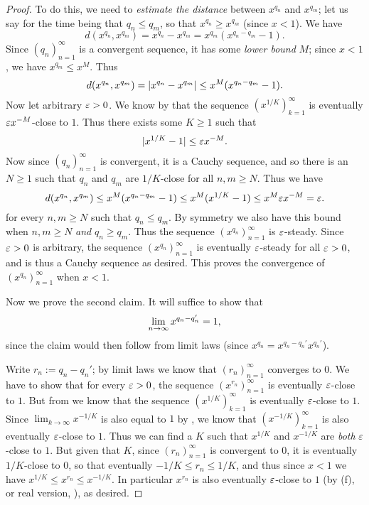 \begin{proof}
To do this, we need to \emph{estimate the distance} between \(x^{q_n}\) and \(x^{q_m}\);
let us say for the time being that \(q_n \le q_m\), so that \(x^{q_n} \ge x^{q_m}\) (since \(x < 1\)).
We have
\[
    d(x^{q_n}, x^{q_m}) = x^{q_n} - x^{q_m} = x^{q_m} (x^{q_n - q_m} - 1).
\]
Since \((q_n)_{n = 1}^{\infty}\) is a convergent sequence, it has some \emph{lower bound} \(M\);
since \(x < 1\), we have \(x^{q_m} \le x^M\).
Thus
\[
    d(x^{q_n}, x^{q_m}) = \lvert x^{q_n} - x^{q_m}\rvert \le x^M (x^{q_n - q_m} - 1).
\]
Now let arbitrary \(\varepsilon > 0\).
We know by  that the sequence \((x^{1/K})_{k = 1}^{\infty}\) is eventually \(\varepsilon x^{-M}\)-close to \(1\).
Thus there exists some \(K \ge 1\) such that
\[
    \lvert x^{1/K} - 1\rvert \le \varepsilon x^{-M}.
\]
Now since \((q_n)_{n = 1}^{\infty}\) is convergent, it is a Cauchy sequence, and so there is an \(N \ge 1\) such that \(q_n\) and \(q_m\) are \(1/K\)-close for all \(n, m \ge N\).
Thus we have
\[
    d(x^{q_n}, x^{q_m}) \le x^M (x^{q_n - q_m} - 1) \le x^M (x^{1/K} - 1) \le x^M \varepsilon x^{-M} = \varepsilon.
\]
for every \(n, m \ge N\) such that \(q_n \le q_m\).
By symmetry we also have this bound when \(n, m \ge N\) \emph{and} \(q_n \ge q_m\).
Thus the sequence \((x^{q_n})_{n = 1}^{\infty}\) is \(\varepsilon\)-steady.
Since \(\varepsilon > 0\) is arbitrary, the sequence \((x^{q_n})_{n = 1}^{\infty}\) is eventually \(\varepsilon\)-steady for all \(\varepsilon > 0\), and is thus a Cauchy sequence as desired.
This proves the convergence of \((x^{q_n})_{n = 1}^\infty\) when \(x < 1\).

Now we prove the second claim.
It will suffice to show that
\[
    \lim_{n \to \infty} x^{q_n - q_n'} = 1,
\]
since the claim would then follow from limit laws
(since \(x^{q_n} = x^{q_n - q_n'} x^{q_n'}\)).

Write \(r_n := q_n - q_n'\);
by limit laws we know that \((r_n)_{n = 1}^{\infty}\) converges to \(0\).
We have to show that for every \(\varepsilon > 0\), the sequence \((x^{r_n})_{n = 1}^{\infty}\) is eventually \(\varepsilon\)-close to \(1\).
But from  we know that the sequence \((x^{1/K})_{k = 1}^\infty\) is eventually \(\varepsilon\)-close to \(1\).
Since \(\lim_{k \to \infty} x^{-1/K}\) is also equal to \(1\) by , we know that \((x^{-1/K})_{k = 1}^{\infty}\) is also eventually \(\varepsilon\)-close to \(1\).
Thus we can find a \(K\) such that \(x^{1/K}\) and \(x^{-1/K}\) are \emph{both} \(\varepsilon\)-close to \(1\).
But given that \(K\), since \((r_n)_{n = 1}^\infty\) is convergent to \(0\), it is eventually \(1/K\)-close to \(0\), so that eventually \(-1/K \le r_n \le 1/K\), and thus since \(x < 1\) we have \(x^{1/K} \le x^{r_n} \le x^{-1/K}\).
In particular \(x^{r_n}\) is also eventually \(\varepsilon\)-close to \(1\) (by (f), or real version, ), as desired.
\end{proof}

